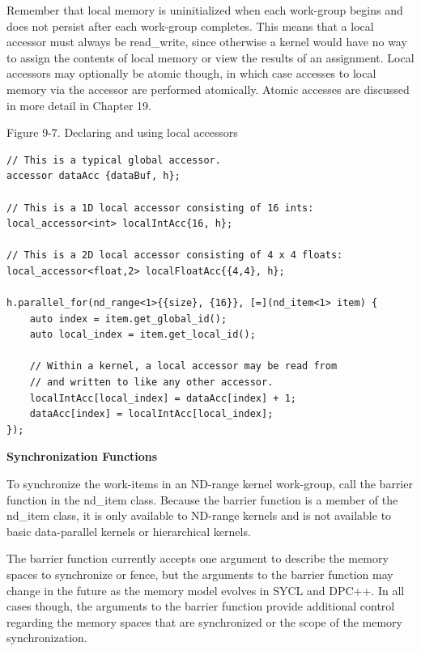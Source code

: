 Remember that local memory is uninitialized when each work-group begins and does not persist after each work-group completes. This means that a local accessor must always be read\_write, since otherwise a kernel would have no way to assign the contents of local memory or view the results of an assignment. Local accessors may optionally be atomic though, in which case accesses to local memory via the accessor are performed atomically. Atomic accesses are discussed in more detail in Chapter 19.\par

\hspace*{\fill} \par %
Figure 9-7. Declaring and using local accessors
\begin{lstlisting}[caption={}]
// This is a typical global accessor.
accessor dataAcc {dataBuf, h};

// This is a 1D local accessor consisting of 16 ints:
local_accessor<int> localIntAcc{16, h};

// This is a 2D local accessor consisting of 4 x 4 floats:
local_accessor<float,2> localFloatAcc{{4,4}, h};

h.parallel_for(nd_range<1>{{size}, {16}}, [=](nd_item<1> item) {
	auto index = item.get_global_id();
	auto local_index = item.get_local_id();
	
	// Within a kernel, a local accessor may be read from
	// and written to like any other accessor.
	localIntAcc[local_index] = dataAcc[index] + 1;
	dataAcc[index] = localIntAcc[local_index];
});
\end{lstlisting}

\hspace*{\fill} \par %
\textbf{Synchronization Functions}

To synchronize the work-items in an ND-range kernel work-group, call the barrier function in the nd\_item class. Because the barrier function is a member of the nd\_item class, it is only available to ND-range kernels and is not available to basic data-parallel kernels or hierarchical kernels.\par

The barrier function currently accepts one argument to describe the memory spaces to synchronize or fence, but the arguments to the barrier function may change in the future as the memory model evolves in SYCL and DPC++. In all cases though, the arguments to the barrier function provide additional control regarding the memory spaces that are synchronized or the scope of the memory synchronization.\par

